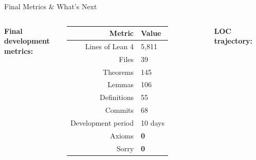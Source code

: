 \documentclass[aspectratio=169,10pt]{beamer}
\begin{document}
\begin{frame}{Final Metrics \& What's Next}
    \vspace{-0.5em}

    \begin{columns}[T]
        \textbf{Final development metrics:}
        {\small
        \begin{tabular}{rl}
            \toprule
            \textbf{Metric} & \textbf{Value} \\
            \midrule
            \rowcolor{cardbg}
            Lines of Lean 4 & \textcolor{leangreen}{5{,}811} \\
            Files & 39 \\
            \rowcolor{cardbg}
            Theorems & \textcolor{leangreen}{145} \\
            Lemmas & \textcolor{leangreen}{106} \\
            \rowcolor{cardbg}
            Definitions & 55 \\
            Commits & 68 \\
            \rowcolor{cardbg}
            Development period & 10 days \\
            Axioms & \textcolor{leangreen}{\textbf{0}} \\
            \rowcolor{cardbg}
            Sorry & \textcolor{leangreen}{\textbf{0}} \\
            \bottomrule
        \end{tabular}
        }

        \vspace{0.2em}

        \textbf{LOC trajectory:}
        \vspace{0.1em}
        \begin{center}
\end{center}
\end{columns}
\end{frame}
\end{document}
